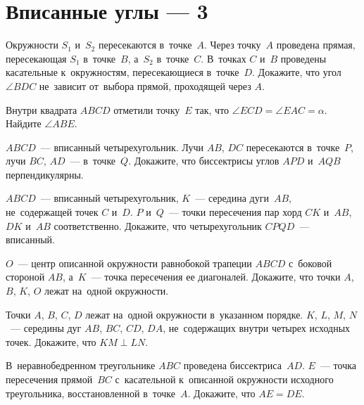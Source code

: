 
\section*{Вписанные углы --- 3}


\begin{problems}

\item
Окружности $S_1$ и~$S_2$ пересекаются в~точке~$A$.
Через точку~$A$ проведена прямая, пересекающая $S_1$ в~точке~$B$, а~$S_2$
в~точке~$C$.
В~точках $C$ и~$B$ проведены касательные к~окружностям, пересекающиеся
в~точке~$D$.
Докажите, что угол $\angle BDC$ не~зависит от~выбора прямой, проходящей
через $A$.

\item
Внутри квадрата $ABCD$ отметили точку~$E$ так, что
$\angle ECD = \angle EAC = \alpha$.
Найдите $\angle ABE$.

\item
$ABCD$~--- вписанный четырехугольник.
Лучи $AB$, $DC$ пересекаются в~точке~$P$, лучи $BC$, $AD$~--- в~точке~$Q$.
Докажите, что биссектрисы углов $APD$ и~$AQB$ перпендикулярны.

\item
$ABCD$~--- вписанный четырехугольник, $K$~--- середина дуги~$AB$, не~содержащей
точек $C$ и~$D$.
$P$ и~$Q$~--- точки пересечения пар хорд $CK$ и~$AB$, $DK$ и~$AB$
соответственно.
Докажите, что четырехугольник $CPQD$~--- вписанный.

\item
$O$~--- центр описанной окружности равнобокой трапеции $ABCD$ с~боковой
стороной $AB$, а~$K$~--- точка пересечения ее диагоналей.
Докажите, что точки $A$, $B$, $K$, $O$ лежат на~одной окружности.

\item
Точки $A$, $B$, $C$, $D$ лежат на~одной окружности в~указанном порядке.
$K$, $L$, $M$, $N$~--- середины дуг $AB$, $BC$, $CD$, $DA$, не~содержащих
внутри четырех исходных точек.
Докажите, что $KM \perp LN$.

\item
В~неравнобедренном треугольнике $ABC$ проведена биссектриса~$AD$.
$E$~--- точка пересечения прямой~$BC$ с~касательной к~описанной окружности
исходного треугольника, восстановленной в~точке~$A$.
Докажите, что $AE = DE$.

\end{problems}

